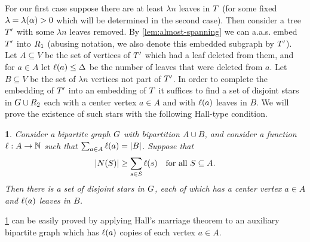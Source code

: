 \documentclass[11pt,english]{article}
\theoremstyle{plain}
\theoremstyle{plain}
\theoremstyle{plain}
\newtheorem{lem}[thm]{\protect\lemmaname}
\theoremstyle{plain}
\theoremstyle{plain}
\theoremstyle{definition}
\theoremstyle{definition}
\theoremstyle{remark}
\theoremstyle{remark}
\theoremstyle{plain}
\theoremstyle{definition}
\theoremstyle{definition}
\theoremstyle{plain}
\theoremstyle{plain}
\theoremstyle{plain}
\newtheorem{mylem}[mythm]{\protect\lemmaname}
\renewenvironment{lem}{\begin{mylem}}{\end{mylem}}
\theoremstyle{plain}
\theoremstyle{remark}
\theoremstyle{plain}
\theoremstyle{definition}
\let\originalleft\left
\let\originalright\right
\renewcommand{\left}{\mathopen{}\mathclose\bgroup\originalleft}
\renewcommand{\right}{\aftergroup\egroup\originalright}
\providecommand{\lemmaname}{Lemma}
\begin{document}
For our first case suppose there are at least $\lambda n$ leaves
in $T$ (for some fixed $\lambda=\lambda\left(\a\right)>0$ which
will be determined in the second case). Then consider a tree $T'$
with some $\lambda n$ leaves removed. By \ref{lem:almost-spanning}
we can a.a.s. embed $T'$ into $R_{1}$ (abusing notation, we also
denote this embedded subgraph by $T'$). Let $A\subseteq V$ be the
set of vertices of $T'$ which had a leaf deleted from them, and
for $a\in A$ let $\ell\left(a\right)\le\Delta$ be the number of
leaves that were deleted from $a$. Let $B\subseteq V$ be the set
of $\lambda n$ vertices not part of $T'$. In order to complete
the embedding of $T'$ into an embedding of $T$ it suffices to
find a set of disjoint stars in $G\cup R_{2}$ each with a center
vertex $a\in A$ and with $\ell\left(a\right)$ leaves in $B$. We
will prove the existence of such stars with the following Hall-type
condition.
\begin{lem}
\label{lem:hall-stars}Consider a bipartite graph $G$ with bipartition
$A\cup B$, and consider a function $\ell:A\to\mathbb{N}$ such that $\sum_{a\in A}\ell\left(a\right)=\left|B\right|$.
Suppose that 
\[
\left|N\left(S\right)\right|\ge\sum_{s\in S}\ell\left(s\right)\quad\mbox{for all }S\subseteq A.
\]
Then there is a set of disjoint stars in $G$, each of which has
a center vertex $a\in A$ and $\ell\left(a\right)$ leaves in $B$.
\end{lem}
\ref{lem:hall-stars} can be easily proved by applying Hall's marriage
theorem to an auxiliary bipartite graph which has $\ell\left(a\right)$
copies of each vertex $a\in A$.
\end{document}
